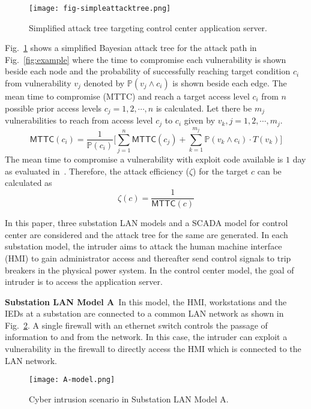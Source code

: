 \begin{figure}[htbp]
	\centering
	\texttt{[image: fig-simpleattacktree.png]}
	\caption{Simplified attack tree targeting control center application server.}
	\label{fig:simpleattacktree}
\end{figure}
Fig.~\ref{fig:simpleattacktree} shows a simplified Bayesian attack tree for the attack path in Fig.~\ref{fig:example} where the time to compromise each vulnerability is shown beside each node and the probability of successfully reaching target condition $c_i$ from vulnerability $v_j$ denoted by $\mathbb{P}(v_j\wedge c_i)$ is shown beside each edge. The mean time to compromise (MTTC) and reach a target access level $c_i$ from $n$ possible prior access levels $c_j=1,2,\cdots,n$ is calculated. Let there be $m_j$ vulnerabilities to reach from access level $c_j$ to $c_i$ given by $v_k,j=1,2,\cdots,m_j$.
\begin{equation}
\mathsf{MTTC}(c_i)=\dfrac{1}{\mathbb{P}(c_i)}\bigg[\sum_{j=1}^{n}\mathsf{MTTC}(c_j)+\sum_{k=1}^{m_j}{\mathbb{P}(v_k\wedge c_i)\cdot T(v_k)}\bigg]
\end{equation}
The mean time to compromise a vulnerability with exploit code available is $1$ day as evaluated in~\cite{mcqueen}. Therefore, the attack efficiency ($\zeta$) for the target $c$ can be calculated as 
\begin{equation}
\zeta(c)=\dfrac{1}{\mathsf{MTTC}(c)}
\end{equation}

In this paper, three substation LAN models and a SCADA model for control center are considered and the attack tree for the same are generated. In each substation model, the intruder aims to attack the human machine interface (HMI) to gain administrator access and thereafter send control signals to trip breakers in the physical power system. In the control center model, the goal of intruder is to access the application server.

\noindent\textbf{Substation LAN Model A}\ 
In this model, the HMI, workstations and the IEDs at a substation are connected to a common LAN network as shown in Fig.~\ref{fig:model-A}. A single firewall with an ethernet switch controls the passage of information to and from the network. In this case, the intruder can exploit a vulnerability in the firewall to directly access the HMI which is connected to the LAN network.
\begin{figure}[htbp]
	\centering
	\texttt{[image: A-model.png]}
	\caption{Cyber intrusion scenario in Substation LAN Model A.}
	\label{fig:model-A}
\end{figure}

